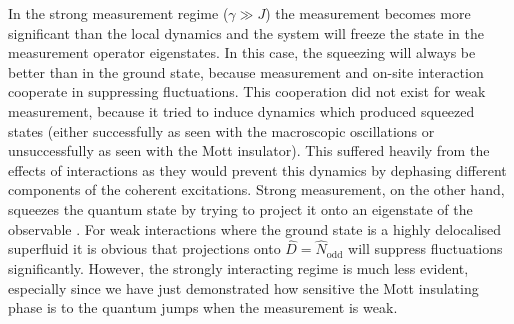 In the strong measurement regime ($\gamma \gg J$) the measurement
becomes more significant than the local dynamics and the system will
freeze the state in the measurement operator eigenstates. In this
case, the squeezing will always be better than in the ground state,
because measurement and on-site interaction cooperate in suppressing
fluctuations. This cooperation did not exist for weak measurement,
because it tried to induce dynamics which produced squeezed states
(either successfully as seen with the macroscopic oscillations or
unsuccessfully as seen with the Mott insulator). This suffered heavily
from the effects of interactions as they would prevent this dynamics
by dephasing different components of the coherent excitations. Strong
measurement, on the other hand, squeezes the quantum state by trying
to project it onto an eigenstate of the observable
\cite{mekhov2009prl, mekhov2009pra}. For weak interactions where the
ground state is a highly delocalised superfluid it is obvious that
projections onto $\hat{D} = \hat{N}_\mathrm{odd}$ will suppress
fluctuations significantly. However, the strongly interacting regime
is much less evident, especially since we have just demonstrated how
sensitive the Mott insulating phase is to the quantum jumps when the
measurement is weak.

